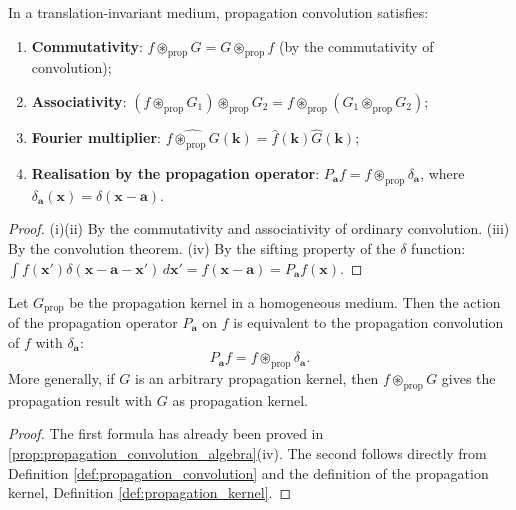 \begin{property}\label{prop:propagation_convolution_algebra}
In a translation-invariant medium, propagation convolution satisfies:
\begin{enumerate}[label=(\roman*)]
    \item \textbf{Commutativity}: $f\circledast_{\text{prop}}G = G\circledast_{\text{prop}}f$ (by the commutativity of convolution);
    \item \textbf{Associativity}: $(f\circledast_{\text{prop}}G_1)\circledast_{\text{prop}}G_2 = f\circledast_{\text{prop}}(G_1\circledast_{\text{prop}}G_2)$;
    \item \textbf{Fourier multiplier}: $\widehat{f\circledast_{\text{prop}}G}(\mathbf{k}) = \hat f(\mathbf{k})\hat G(\mathbf{k})$;
    \item \textbf{Realisation by the propagation operator}: $P_{\mathbf{a}}f = f\circledast_{\text{prop}}\delta_{\mathbf{a}}$, where $\delta_{\mathbf{a}}(\mathbf{x}) = \delta(\mathbf{x}-\mathbf{a})$.
\end{enumerate}
\end{property}

\begin{proof}
(i)(ii) By the commutativity and associativity of ordinary convolution. (iii) By the convolution theorem. (iv) By the sifting property of the $\delta$ function: $\int f(\mathbf{x}')\delta(\mathbf{x}-\mathbf{a}-\mathbf{x}')\,d\mathbf{x}' = f(\mathbf{x}-\mathbf{a}) = P_{\mathbf{a}}f(\mathbf{x})$.
\end{proof}

\begin{theorem}\label{thm:propagation_convolution_operator}
Let $G_{\text{prop}}$ be the propagation kernel in a homogeneous medium. Then the action of the propagation operator $P_{\mathbf{a}}$ on $f$ is equivalent to the propagation convolution of $f$ with $\delta_{\mathbf{a}}$:
\[
P_{\mathbf{a}}f = f\circledast_{\text{prop}}\delta_{\mathbf{a}}.
\]
More generally, if $G$ is an arbitrary propagation kernel, then $f\circledast_{\text{prop}}G$ gives the propagation result with $G$ as propagation kernel.
\end{theorem}

\begin{proof}
The first formula has already been proved in \cref{prop:propagation_convolution_algebra}(iv). The second follows directly from Definition \ref{def:propagation_convolution} and the definition of the propagation kernel, Definition \ref{def:propagation_kernel}.
\end{proof}

